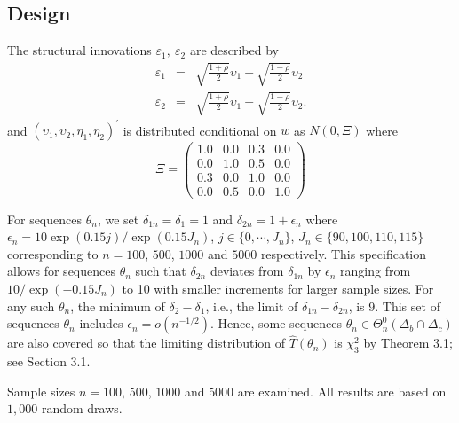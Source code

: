 \documentclass[hidelinks, 11 pt, a4paper, pdflatex]{article}
\begin{document}
{  \subsection{Design}

   The structural innovations $\varepsilon_1, \ \varepsilon_2$ are described by
    \begin{eqnarray*}
     \varepsilon_{1} & = & \sqrt{\frac{1+\rho}{2}}\upsilon_1 + \sqrt{\frac{1-\rho}{2}}\upsilon_2 \\
     \varepsilon_{2} & = & \sqrt{\frac{1+\rho}{2}}\upsilon_1 - \sqrt{\frac{1-\rho}{2}}\upsilon_2.
    \end{eqnarray*}
   and $(\upsilon_1,\upsilon_2,\eta_1,\eta_2)^{\prime}$ is distributed conditional on $w$ as $N(0,\Xi)$ where
    \begin{equation*}
      \Xi = \left(
             \begin{array}{cccc}
              1.0 & 0.0 & 0.3 & 0.0 \\
              0.0 & 1.0 & 0.5 & 0.0 \\
              0.3 & 0.0 & 1.0 & 0.0 \\
              0.0 & 0.5 & 0.0 & 1.0
             \end{array}
            \right)
    \end{equation*}

   For sequences $\theta_n$, we set $\delta_{1n} = \delta_1 = 1$ and $\delta_{2n} = 1 + \epsilon_n$ where $\epsilon_n = 10\exp(0.15j)/\exp(0.15J_n)$, $j \in \{0,\cdots,J_n\}$, $J_n \in \{90,100,110,115\}$ corresponding to $n=100$, $500$, $1000$ and $5000$ respectively. This specification allows for sequences $\theta_n$ such that $\delta_{2n}$ deviates from $\delta_{1n}$ by $\epsilon_n$ ranging from $10/\exp(-0.15J_n)$ to 10 with smaller increments for larger sample sizes. For any such $\theta_n$, the minimum of $\delta_{2} - \delta_1$, i.e., the limit of $\delta_{1n} - \delta_{2n}$, is $9$. This set of sequences $\theta_n$ includes $\epsilon_n = o(n^{-1/2})$. Hence, some sequences $\theta_n \in \Theta_n^{0}(\Delta_b \cap \Delta_c)$ are also covered so that the limiting distribution of $\hat{T}(\theta_n)$ is $\chi_3^2$ by Theorem 3.1; see Section 3.1.

   Sample sizes $n = 100$, $500$, $1000$ and $5000$ are examined. All results are based on $1,000$ random draws.


}
\end{document}
